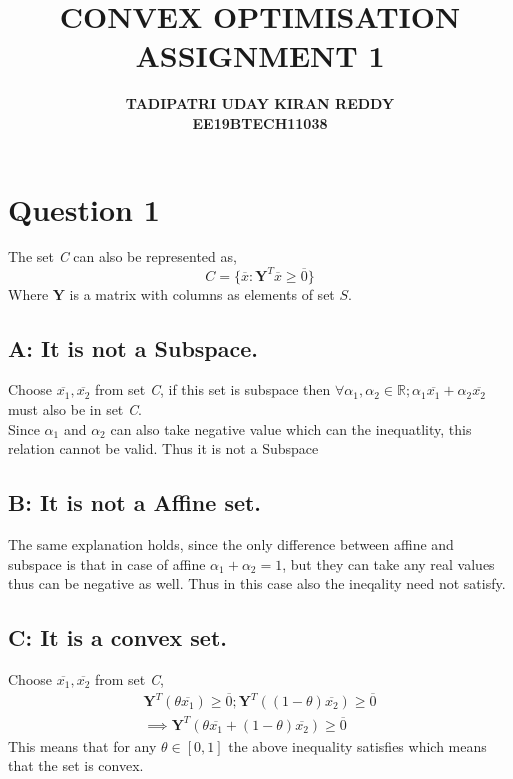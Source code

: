 \documentclass{article}
\begin{document}
\title{\textbf{CONVEX OPTIMISATION}\\{\textbf{ASSIGNMENT 1}}}
\author{\textbf{TADIPATRI UDAY KIRAN REDDY}\\\textbf{EE19BTECH11038}}
\maketitle

\section*{\hfil Question 1}
The set \textit{C} can also be represented as,
\begin{equation*}
	C = \{\overline{x}: \mathbf{Y}^T\overline{x} \ge \overline{0}\}
\end{equation*}
Where $\mathbf{Y}$ is a matrix with columns as elements of set $S$.
\subsection*{A: It is not a Subspace.}
Choose $\overline{x_1}, \overline{x_2}$ from set \textit{C}, if this set is subspace then $\forall \alpha _1, \alpha _2 \in \mathbb{R}; \alpha _1\overline{x_1} + \alpha _2\overline{x_2}$ must also be in set \textit{C}.\\
Since $\alpha _1$ and $\alpha _2$ can also take negative value which can the inequatlity, this relation cannot be valid. Thus it is not a Subspace

\subsection*{B: It is not a Affine set.}
The same explanation holds, since the only difference between affine and subspace is that in case of affine $\alpha _1 + \alpha _2 = 1$, but they can take any real values thus can be negative as well. Thus in this case also the ineqality need not satisfy.


\subsection*{C: It is a convex set.}
Choose $\overline{x_1}, \overline{x_2}$ from set \textit{C},
\begin{gather*}
	\mathbf{Y}^T(\theta \overline{x_1}) \ge \overline{0}; \mathbf{Y}^T((1 - \theta )\overline{x_2}) \ge \overline{0}\\
	\implies \mathbf{Y}^T(\theta \overline{x_1} + (1 - \theta )\overline{x_2}) \ge \overline{0}
\end{gather*}
This means that for any $\theta \in [0, 1]$ the above inequality satisfies which means that the set is convex.
\end{document}
